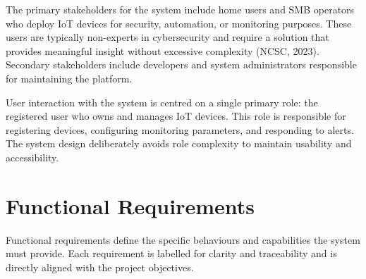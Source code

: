 The primary stakeholders for the system include home users and SMB operators who deploy IoT devices for security, automation, or monitoring purposes. These users are typically non-experts in cybersecurity and require a solution that provides meaningful insight without excessive complexity (NCSC, 2023). Secondary stakeholders include developers and system administrators responsible for maintaining the platform.

User interaction with the system is centred on a single primary role: the registered user who owns and manages IoT devices. This role is responsible for registering devices, configuring monitoring parameters, and responding to alerts. The system design deliberately avoids role complexity to maintain usability and accessibility.

\section{Functional Requirements}

Functional requirements define the specific behaviours and capabilities the system must provide. Each requirement is labelled for clarity and traceability and is directly aligned with the project objectives.

